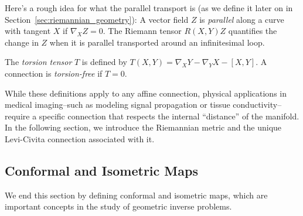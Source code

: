 Here's a rough idea for what the parallel transport is (as we define it later on in Section~\ref{sec:riemannian_geometry}): A vector field $Z$ is \emph{parallel} along a curve with tangent $X$ if $\nabla_X Z = 0$. The Riemann tensor $R(X, Y)Z$ quantifies the change in $Z$ when it is parallel transported around an infinitesimal loop.

\begin{definition}
  The \emph{torsion tensor} $T$ is defined by $T(X,Y) = \nabla_X Y - \nabla_Y X - [X,Y]$. A connection is \emph{torsion-free} if $T = 0$.
\end{definition}

While these definitions apply to any affine connection, physical applications in medical imaging--such as modeling signal propagation or tissue conductivity--require a specific connection that respects the internal ``distance'' of the manifold. In the following section, we introduce the Riemannian metric and the unique Levi-Civita connection associated with it.

\subsection{Conformal and Isometric Maps} We end this section by defining conformal and isometric maps, which are important concepts in the study of geometric inverse problems.
